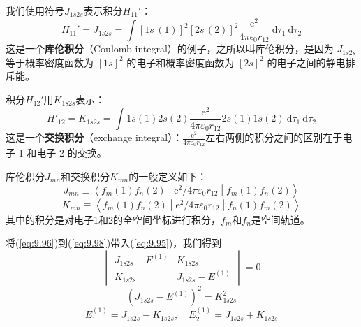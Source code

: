     我们使用符号$J_{1s2s}$表示积分$H_{11}'$：
    \begin{equation}
        H_{11}' = J_{1s2s} = \int [1s\,(1)]^2 [2s\,(2)]^2 \frac{\mathrm{e}^2}{4\pi \epsilon_0 r_{12}}\: \mathrm{d}\tau_1\: \mathrm{d}\tau_2
        \label{eq:9.97}
    \end{equation}
    这是一个\textbf{库伦积分}（Coulomb integral）的例子，之所以叫库伦积分，是因为 $J_{1s2s}$ 等于概率密度函数为 $\left[1s\right]^2$ 的电子和概率密度函数为 $\left[2s\right]^2$ 的电子之间的静电排斥能。

    积分$H_{12}'$用$K_{1s2s}$表示：
    \begin{equation}
        H'_{12} = K_{1s2s} = \int 1s\left(1\right)2s\left(2\right) \frac{\mathrm{e}^2}{4\pi\varepsilon_0r_{12}} 2s\left(1\right)1s\left(2\right)\: \mathrm{d}\tau_1 \:\mathrm{d}\tau_2
        \label{eq:9.98}
    \end{equation}
    这是一个\textbf{交换积分}（exchange integral）：$\frac{\mathrm{e}^2}{4\pi\varepsilon_0r_{12}}$左右两侧的积分之间的区别在于电子 1 和电子 2 的交换。

    库伦积分$J_{mn}$和交换积分$K_{mn}$的一般定义如下：
    \begin{equation}
        J_{mn} \equiv \left\langle f_m(1) f_n(2) \middle| \mathrm{e}^2/4\pi\varepsilon_0 r_{12} \middle| f_m(1) f_n(2) \right\rangle
        \label{eq:9.99}
    \end{equation}
    \begin{equation}
        K_{mn} \equiv \left\langle f_m(1) f_n(2) \middle| \mathrm{e}^2/4\pi\varepsilon_0 r_{12} \middle| f_n(1) f_m(2) \right\rangle
        \label{eq:9.100}
    \end{equation}
    其中的积分是对电子1和2的全空间坐标进行积分，$f_m$和$f_n$是空间轨道。

    将(\ref{eq:9.96})到(\ref{eq:9.98})带入(\ref{eq:9.95})，我们得到
    \begin{equation}
        \begin{vmatrix}
            J_{1s2s} - E^{\left(1\right)} & K_{1s2s} \\
            K_{1s2s} & J_{1s2s} - E^{\left(1\right)}
        \end{vmatrix} = 0
        \label{eq:9.101}
    \end{equation}
    \begin{equation*}
        \left(J_{1s2s} - E^{\left(1\right)}\right)^2 = K_{1s2s}^2
    \end{equation*}
    \begin{equation}
        E_1^{\left(1\right)} = J_{1s2s} - K_{1s2s}, \quad E_2^{\left(1\right)} = J_{1s2s} + K_{1s2s}
        \label{eq:9.102}
    \end{equation}

